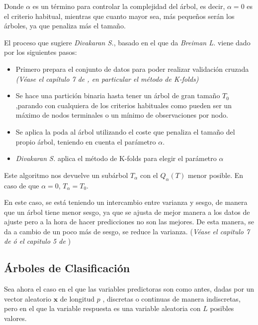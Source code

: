 \noindent Donde $\alpha$ es un término para controlar la complejidad del árbol, es decir, $\alpha=0$ es el criterio habitual, mientras que cuanto mayor sea, más pequeños serán los árboles, ya que penaliza más el tamaño.  

\noindent El proceso que sugiere \emph{Divakaran S.}\cite{Divakaran 2022}, basado en el que da \emph{Breiman L.}\cite{Breiman 1984} viene dado por los siguientes pasos:
\begin{itemize}
\item Primero prepara el conjunto de datos para poder realizar validación cruzada \emph{(Véase el capítulo 7 de \cite{Hastie 2001}, en particular el método de K-folds)}
\item Se hace una partición binaria hasta tener un árbol de gran tamaño $T_0$,parando con cualquiera de los criterios habituales como pueden ser un máximo de nodos terminales o un mínimo de observaciones por nodo. 

\item Se aplica la poda al árbol utilizando el coste que penaliza el tamaño del propio árbol, teniendo en cuenta el parámetro $\alpha$. 

\item \emph{Divakaran S.}\cite{Divakaran 2022} aplica el método de K-folds para elegir el parámetro $\alpha$
\end{itemize}

\noindent Este algoritmo nos devuelve un subárbol $T_{\alpha}$ con el $Q_{\alpha}(T)$ menor posible. En caso de que $\alpha=0$, $T_{\alpha}=T_0$.

\noindent En este caso, se está teniendo un intercambio entre varianza y sesgo, de manera que un árbol tiene menor sesgo, ya que se ajusta de mejor manera a los datos de ajuste pero a la hora de hacer predicciones no son las mejores. De esta manera, se da a cambio de un poco más de sesgo, se reduce la varianza. (\emph{Véase el capitulo 7 de \cite{Hastie 2001} ó el capitulo 5 de \cite{James 2013} })

\noindent 



\subsection{Árboles de Clasificación}

\noindent Sea ahora el caso en el que las variables predictoras son como antes, dadas por un vector aleatorio $\mathbf{x}$ de longitud $p$ , discretas o continuas de manera indiscretas, pero en el que la variable respuesta es una variable aleatoria con $L$ posibles valores.

